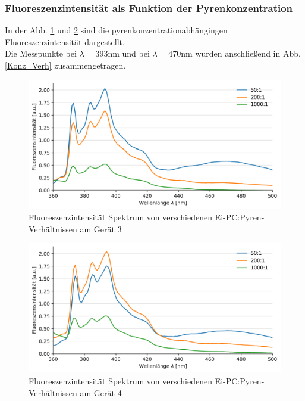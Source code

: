 \subsubsection{Fluoreszenzintensität als Funktion der Pyrenkonzentration}\label{sec:F_von_C}
In der Abb. \ref{Konz_Scan_Device3} und \ref{Konz_Scan_Device4} sind die pyrenkonzentrationabhängingen 
Fluoreszenzintensität dargestellt.  \\
Die Messpunkte bei $\lambda=393$nm und bei $\lambda=470$nm wurden anschließend in Abb. \ref{Konz_Verh} zusammengetragen.

\begin{figure}[h!]
	\begin{center}
		\begin{minipage}{0,6\textwidth}
			
			\includegraphics[width=\textwidth]{analysis/reports/Konz_Device3.png}
			\caption{Fluoreszenzintensität Spektrum von verschiedenen Ei-PC:Pyren-Verhältnissen am Gerät 3} 
			\label{Konz_Scan_Device3} 
		\end{minipage}
	\end{center}
\end{figure}
\begin{figure}[h!]
	\begin{center}
		\begin{minipage}{0,6\textwidth}
			
			\includegraphics[width=\textwidth]{analysis/reports/Konz_Device4.png}
			\caption{Fluoreszenzintensität Spektrum von verschiedenen Ei-PC:Pyren-Verhältnissen am Gerät 4} 
			\label{Konz_Scan_Device4} 
		\end{minipage}
	\end{center}
\end{figure}
